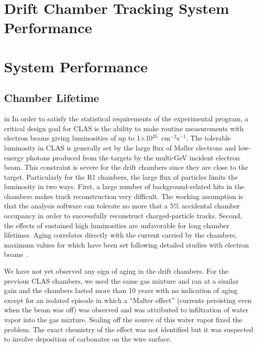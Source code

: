 \section{Drift Chamber Tracking System Performance}

\section{System Performance}

\subsection{Chamber Lifetime}
\label{choper}

 in 
In order to satisfy the statistical requirements of the experimental program, 
a critical design goal for CLAS is the ability to make routine measurements 
with electron beams giving luminosities of up to 
1$\times$10$^{35}$~cm$^{-2}$s$^{-1}$.  The tolerable luminosity in CLAS is 
generally set by the large flux of M{\o}ller electrons and low-energy photons 
produced from the targets by the multi-GeV incident electron beam.  This 
constraint is severe for the drift chambers since they are close to the 
target. Particularly for the R1 chambers, the large flux of 
particles limits the luminosity in two ways.  First, a large number of 
background-related hits in the chambers makes track reconstruction very 
difficult.  The working assumption is that the analysis software can tolerate 
no more that a 5$\%$ accidental chamber occupancy in order to successfully 
reconstruct charged-particle tracks.  Second, the effects of sustained high 
luminosities are unfavorable for long chamber lifetimes.  Aging correlates 
directly with the current carried by the chambers, maximum values for which 
have been set following detailed studies with electron beams~\cite{carman}.

We have not yet observed any sign of aging in the drift chambers.
For the previous CLAS chambers, we used the same gas mixture and ran at a
similar gain and the chambers lasted more than 10 years with no indication
of aging except for an isolated episode in which a ``Malter effect'' (currents
persisting even when the beam was off) was observed and was attributed to
infiltration of water vapor into the gas mixture.  Sealing off the source of
this water vapor fixed the problem.  The exact chemistry of the effect was
not identified but it was suspected to involve deposition of carbonates on
the wire surface.


